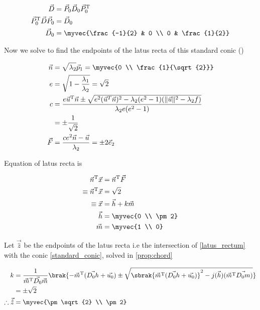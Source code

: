 \documentclass{article}
\numberwithin{equation}{section}
\numberwithin{figure}{section}
\begin{document}
\begin{align}
	\vec{D} &= \vec{P}_0\vec{D}_0\vec{P}_0^\text{T}\\
	\vec{P}_0^\text{T}\vec{D}\vec{P}_0 &= \vec{D}_0\\
	\vec{D}_0 &= \myvec{\frac{-1}{2} & 0 \\ 0 & \frac{1}{2}}
\end{align}

Now we solve to find the endpoints of the latus recta of this standard conic ()

\begin{align}
	\vec{n} &= \sqrt{\lambda_2}\vec{p}_1 = \myvec{0 \\ \frac{1}{\sqrt{2}}}\\
	e &= \sqrt{1 - \frac{\lambda_1}{\lambda_2}} = \sqrt{2}\\
	c &= \dfrac{e\vec{u}^\text{T}\vec{n} \pm \sqrt{e^2 (\vec{u}^T \vec{n})^2 - \lambda_2(e^2 - 1)(\Vert \vec{u} \Vert^2-\lambda_2f)}}{\lambda_2e(e^2 - 1)}\\
	&= \pm \frac{1}{\sqrt{2}}\\
	\vec{F} &= \dfrac{ce^2\vec{n}-\vec{u}}{\lambda_2} = \pm 2 \vec{e}_2\\
\end{align}

Equation of latus recta is

\begin{align}
	\vec{n}^\text{T}\vec{x} &= \vec{n}^\text{T}\vec{F}\\
	\equiv \vec{n}^\text{T}\vec{x} &= \sqrt{2}\\
	\equiv \vec{x} &= \vec{h} + k\vec{m} \label{latus_rectum}\\
	\vec{h} &= \myvec{0 \\ \pm 2}\\
	\vec{m} &= \myvec{1 \\ 0}
\end{align}

Let $\vec{\hat{z}}$ be the endpoints of the latus recta i.e the intersection of \eqref{latus_rectum} with the conic \eqref{standard_conic}, solved in \ref{prop:chord}

\begin{align}
	k &= \frac{1}{\vec{m}^\text{T}\vec{D_0}\vec{m}} \brak{-\vec{m}^\text{T}(\vec{D_0h} + \vec{u_0}) \pm \sqrt{\sbrak{\vec{m}^\text{T}(\vec{D_0h} + \vec{u_0})}^2 - j(\vec{h}) (\vec{m}^\text{T}\vec{D_0m})}}\\
	&= \pm \sqrt{2}\\
	\therefore \vec{\hat{z}} &= \myvec{\pm \sqrt{2} \\ \pm 2}
\end{align}
\end{document}
